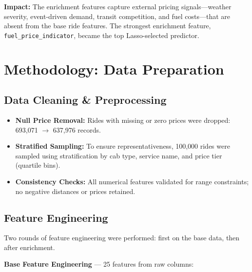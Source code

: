 \documentclass[12pt,a4paper]{article}
\begin{document}
\textbf{Impact:} The enrichment features capture external pricing signals---weather severity, event-driven demand, transit competition, and fuel costs---that are absent from the base ride features. The strongest enrichment feature, \texttt{fuel\_price\_indicator}, became the top Lasso-selected predictor.

\newpage

\section{Methodology: Data Preparation}

\subsection{Data Cleaning \& Preprocessing}

\begin{itemize}
    \item \textbf{Null Price Removal:} Rides with missing or zero prices were dropped: 693,071 $\rightarrow$ 637,976 records.
    \item \textbf{Stratified Sampling:} To ensure representativeness, 100,000 rides were sampled using stratification by cab type, service name, and price tier (quartile bins).
    \item \textbf{Consistency Checks:} All numerical features validated for range constraints; no negative distances or prices retained.
\end{itemize}

\subsection{Feature Engineering}

Two rounds of feature engineering were performed: first on the base data, then after enrichment.

\textbf{Base Feature Engineering} --- 25 features from raw columns:
\end{document}

